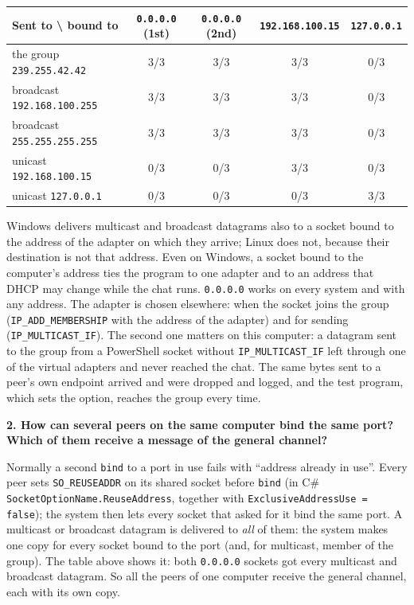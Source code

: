 \documentclass[11pt,a4paper]{article}
\newcommand{\question}[1]{\par\medskip\textbf{#1}\par}
\newcommand{\code}[1]{{\frenchspacing\texttt{#1}}}
\begin{document}
\begin{center}
\footnotesize
\begin{tabular}{lcccc}
\toprule
Sent to \textbackslash{} bound to & \code{0.0.0.0} (1st) & \code{0.0.0.0} (2nd) & \code{192.168.100.15} & \code{127.0.0.1} \\
\midrule
the group \code{239.255.42.42}     & 3/3 & 3/3 & 3/3 & 0/3 \\
broadcast \code{192.168.100.255}   & 3/3 & 3/3 & 3/3 & 0/3 \\
broadcast \code{255.255.255.255}   & 3/3 & 3/3 & 3/3 & 0/3 \\
unicast \code{192.168.100.15}      & 0/3 & 0/3 & 3/3 & 0/3 \\
unicast \code{127.0.0.1}           & 0/3 & 0/3 & 0/3 & 3/3 \\
\bottomrule
\end{tabular}
\end{center}

Windows delivers multicast and broadcast datagrams also to a socket bound to the address of the
adapter on which they arrive; Linux does not, because their destination is not that address.
Even on Windows, a socket bound to the computer's address ties the program to one adapter and to
an address that DHCP may change while the chat runs. \code{0.0.0.0} works on every system and with
any address. The adapter is chosen elsewhere: when the socket joins the group
(\code{IP\_ADD\_MEMBERSHIP} with the address of the adapter) and for sending
(\code{IP\_MULTICAST\_IF}). The second one matters on this computer: a datagram sent to the group
from a PowerShell socket without \code{IP\_MULTICAST\_IF} left through one of the virtual adapters
and never reached the chat. The same bytes sent to a peer's own endpoint arrived and were dropped
and logged, and the test program, which sets the option, reaches the group every time.

\question{2. How can several peers on the same computer bind the same port? Which of them receive a
message of the general channel?}

Normally a second \code{bind} to a port in use fails with ``address already in use''. Every peer
sets \code{SO\_REUSEADDR} on its shared socket before \code{bind} (in C\#
\code{SocketOptionName.ReuseAddress}, together with \code{ExclusiveAddressUse = false}); the system
then lets every socket that asked for it bind the same port. A multicast or broadcast datagram is
delivered to \emph{all} of them: the system makes one copy for every socket bound to the port (and,
for multicast, member of the group). The table above shows it: both \code{0.0.0.0} sockets got
every multicast and broadcast datagram. So all the peers of one computer receive the general
channel, each with its own copy.
\end{document}
